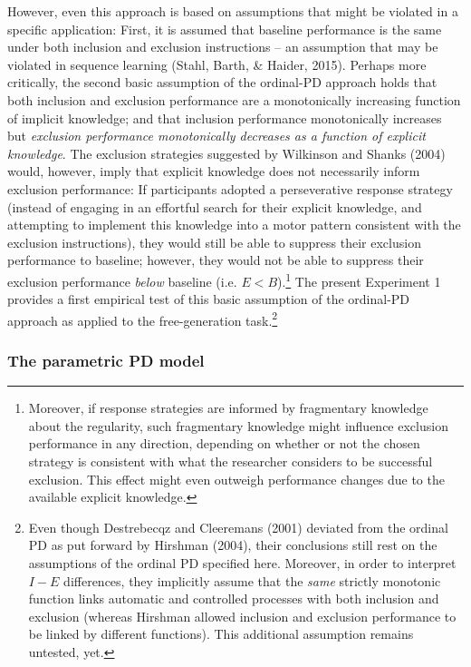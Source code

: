 \documentclass[floatsintext,doc]{apa6}
\theoremstyle{definition}
\theoremstyle{definition}
\theoremstyle{definition}
\theoremstyle{remark}
\begin{document}
However, even this approach is based on assumptions that might be
violated in a specific application: First, it is assumed that baseline
performance is the same under both inclusion and exclusion instructions
-- an assumption that may be violated in sequence learning (Stahl,
Barth, \& Haider, 2015). Perhaps more critically, the second basic
assumption of the ordinal-PD approach holds that both inclusion and
exclusion performance are a monotonically increasing function of
implicit knowledge; and that inclusion performance monotonically
increases but \emph{exclusion performance monotonically decreases as a
function of explicit knowledge}. The exclusion strategies suggested by
Wilkinson and Shanks (2004) would, however, imply that explicit
knowledge does not necessarily inform exclusion performance: If
participants adopted a perseverative response strategy (instead of
engaging in an effortful search for their explicit knowledge, and
attempting to implement this knowledge into a motor pattern consistent
with the exclusion instructions), they would still be able to suppress
their exclusion performance to baseline; however, they would not be able
to suppress their exclusion performance \emph{below} baseline (i.e.
\(E < B\)).\footnote{Moreover, if response strategies are informed by
  fragmentary knowledge about the regularity, such fragmentary knowledge
  might influence exclusion performance in any direction, depending on
  whether or not the chosen strategy is consistent with what the
  researcher considers to be successful exclusion. This effect might
  even outweigh performance changes due to the available explicit
  knowledge.} The present Experiment 1 provides a first empirical test
of this basic assumption of the ordinal-PD approach as applied to the
free-generation task.\footnote{Even though Destrebecqz and Cleeremans
  (2001) deviated from the ordinal PD as put forward by Hirshman (2004),
  their conclusions still rest on the assumptions of the ordinal PD
  specified here. Moreover, in order to interpret \(I-E\) differences,
  they implicitly assume that the \emph{same} strictly monotonic
  function links automatic and controlled processes with both inclusion
  and exclusion (whereas Hirshman allowed inclusion and exclusion
  performance to be linked by different functions). This additional
  assumption remains untested, yet.}

\subsubsection{The parametric PD model}\label{the-parametric-pd-model}
\end{document}
